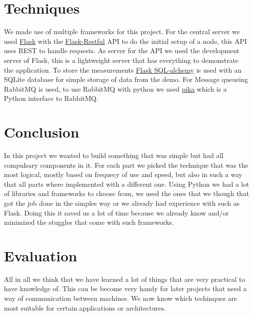 \documentclass{article}
\begin{document}
\section{Techniques}
    We made use of multiple frameworks for this project. For the central server
    we used \href{http://flask.pocoo.org/}{Flask} with the 
    \href{https://flask-restful.readthedocs.io/en/0.3.5/}{Flask-Restful} API to
    do the initial setup of a node, this API uses REST to handle requests. As
    server for the API we used the development server of Flask, this is a 
    lightweight server that has everything to demonstrate the application. To 
    store the measurements 
    \href{http://flask-sqlalchemy.pocoo.org/2.1/}{Flask SQL-alchemy} is used 
    with an SQLite database for simple storage of data from the demo.
    For Message queueing RabbitMQ is used, to use RabbitMQ with python we 
    used \href{https://github.com/pika/pika}{pika} which is a Python interface
    to RabbitMQ. 

\section{Conclusion}
    In this project we wanted to build something that was simple but had all
    compulsary components in it. For each part we picked the technique that 
    was the most logical, mostly based on frequecy of use and speed, but also in
    such a way that all parts where implemented with a different one. Using 
    Python we had a lot of libraries and frameworks to choose from, we used 
    the ones that we though that got the job done in the simples way or we 
    already had experience with such as Flask. Doing this it saved us a lot of 
    time because we already know and/or minimized the stuggles that come with 
    such frameworks. 

\section{Evaluation}
    All in all we think that we have learned a lot of things that are very 
    practical to have knowledge of. This can be become very handy for later 
    projects that need a way of communication between machines. We now know 
    which techinques are most suitable for certain applications or architectures.
\end{document}
